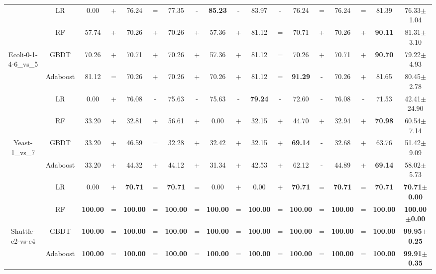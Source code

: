 \documentclass[journal]{IEEEtran}
\begin{document}
\begin{table*}
\begin{threeparttable}
\begin{tabular}{|c|c|cc|cc|cc|cc|cc|cc|cc|cc|}
			& LR    & 0.00  & +     & 76.24  & =     & 77.35  & -     & \textbf{85.23}  & -     & 83.97  & -     & 76.24  & =     & 76.24  & =     & 81.39  & 76.33$\pm$1.04  \\
			& RF    & 57.74  & +     & 70.26  & +     & 70.26  & +     & 57.36  & +     & 81.12  & =     & 70.71  & +     & 70.26  & +     &\textbf{90.11}  & 81.31$\pm$3.10  \\
			Ecoli-0-1-4-6\_vs\_5
			& GBDT  & 70.26  & +     & 70.71  & +     & 70.26  & +     & 57.36  & +     & 81.12  & =     & 70.26  & +     & 70.71  & +     & \textbf{90.70}  & 79.22$\pm$4.93  \\
			& Adaboost & 81.12  & =     & 70.26  & +     & 70.26  & +     & 70.26  & +     & 81.12  & =     & \textbf{91.29}  & -     & 70.26  & +     & 81.65  & 80.45$\pm$2.78  \\
			\hline
			
			& LR    & 0.00  & +     & 76.08  & -     & 75.63  & -     & 75.63  & -     & \textbf{79.24}  & -     & 72.60  & -     & 76.08  & -     & 71.53  & 42.41$\pm$24.90  \\
			& RF    & 33.20  & +     & 32.81  & +     & 56.61  & +     & 0.00  & +     & 32.15  & +     & 44.70  & +     & 32.94  & +     & \textbf{70.98}  & 60.54$\pm$7.14  \\
			Yeast-1\_vs\_7
			& GBDT  & 33.20  & +     & 46.59  & =     & 32.28  & +     & 32.42  & +     & 32.15  & +     &\textbf{69.14}  & -     & 32.68  & +     & 63.76  & 51.42$\pm$9.09  \\
			& Adaboost & 33.20  & +     & 44.32  & +     & 44.12  & +     & 31.34  & +     & 42.53  & +     & 62.12  & -     & 44.89  & +     &\textbf{69.14}  & 58.02$\pm$5.73  \\
			\hline
			
			& LR    & 0.00  & +     & \textbf{70.71}  & =     & \textbf{70.71}  & =     & 0.00  & +     & 0.00  & +     & \textbf{70.71}  & =     & \textbf{70.71}  & =     & \textbf{70.71}  & \textbf{70.71$\pm$0.00}  \\
			& RF    & \textbf{100.00}  & =     & \textbf{100.00}  & =     & \textbf{100.00}  & =     & \textbf{100.00}  & =     & \textbf{100.00} & =     & \textbf{100.00}  & =     &\textbf{100.00}  & =     & \textbf{100.00}  & \textbf{100.00$\pm$0.00}  \\
			Shuttle-c2-vs-c4
			& GBDT   & \textbf{100.00}  & =     & \textbf{100.00}  & =     & \textbf{100.00}  & =     & \textbf{100.00}  & =     & \textbf{100.00} & =     & \textbf{100.00}  & =     &\textbf{100.00}  & =     & \textbf{100.00}   & \textbf{99.95$\pm$0.25}  \\
			& Adaboost & \textbf{100.00}  & =     & \textbf{100.00}  & =     & \textbf{100.00}  & =     & \textbf{100.00}  & =     & \textbf{100.00} & =     & \textbf{100.00}  & =     &\textbf{100.00}  & =     & \textbf{100.00}  & \textbf{99.91$\pm$0.35}  \\
			\hline
			

\end{tabular}
\end{threeparttable}
\end{table*}
\end{document}
